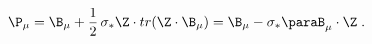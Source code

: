 \begin{equation}
\label{e5:26}
\P_{\mu} =\B_{\mu} + \frac{1}{2} \, \sigma_{\ast} \Z \cdot tr(\Z\cdot \B_{\mu})=\B_{\mu}-\sigma_{\ast}\paraB_{\mu}\cdot \Z \; .
\end{equation}

